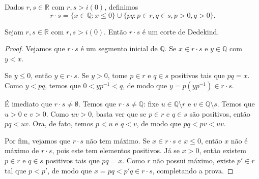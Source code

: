 \begin{definition}
    Dados $r, s \in \mathbb R$ com $r, s>i(0)$, definimos
    \[
        r\cdot s = \{x \in \mathbb Q: x\leq 0\}\cup\{pq : p\in r, q\in s, p>0, q>0\}.
    \]
\end{definition}
\begin{lemma}
    Sejam $r, s \in \mathbb R$ com $r, s>i(0)$.
    Então $r\cdot s$ é um corte de Dedekind.
\end{lemma}
\begin{proof}
    Vejamos que $r\cdot s$ é um segmento inicial de $\mathbb Q$.
    Se $x \in r\cdot s$ e $y\in\mathbb Q$ com $y<x$.

    Se $y\leq 0$, então $y \in r\cdot s$.
    Se $y>0$, tome $p\in r$ e $q\in s$ positivos tais que $pq=x$.
    Como $y<pq$, temos que $0<yp^{-1}<q$, de modo que $y=p(yp^{-1})\in r\cdot s$.

    É imediato que $r\cdot s\neq \emptyset$.
    Temos que $r\cdot s\neq \mathbb Q$: fixe $u\in \mathbb Q\setminus r$ e $v\in \mathbb Q\setminus s$.
    Temos que $u>0$ e $v>0$.
    Como $uv>0$, basta ver que se $p\in r$ e $q\in s$ são positivos, então $pq<uv$.
    Ora, de fato, temos $p<u$ e $q<v$, de modo que $pq<pv<uv$.

    Por fim, vejamos que $r\cdot s$ não tem máximo.
    Se $x \in r\cdot s$ e $x\leq 0$, então $x$ não é máximo de $r\cdot s$, pois este tem elementos positivos.
    Já se $x>0$, então existem $p\in r$ e $q\in s$ positivos tais que $pq=x$.
    Como $r$ não possui máximo, existe $p'\in r$ tal que $p<p'$, de modo que $x=pq<p'q\in r\cdot s$, completando a prova.
\end{proof}

